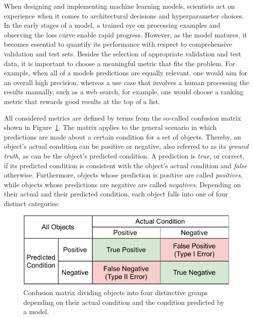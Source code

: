 When designing and implementing machine learning models, scientists act on experience when it comes to architectural decisions and hyperparameter choices. In the early stages of a model, a trained eye on processing examples and observing the loss curve enable rapid progress. However, as the model matures, it becomes essential to quantify its performance with respect to comprehensive validation and test sets. Besides the selection of appropriate validation and test data, it is important to choose a meaningful metric that fits the problem. For example, when all of a models predictions are equally relevant, one would aim for an overall high precision, whereas a use case that involves a human processing the results manually, such as a web search, for example, one would choose a ranking metric that rewards good results at the top of a list.

All considered metrics are defined by terms from the so-called confusion matrix shown in Figure~\ref{fig:2_basics/2_metrics/1_confusion_matrix}. The matrix applies to the general scenario in which predictions are made about a certain condition for a set of objects. Thereby, an object's actual condition can be positive or negative, also referred to as its \emph{ground truth}, as can be the object's predicted condition. A prediction is \emph{true}, or correct, if its predicted condition is consistent with the object's actual condition and \emph{false} otherwise. Furthermore, objects whose prediction is positive are called \emph{positives}, while objects whose predictions are negative are called \emph{negatives}. Depending on their actual and their predicted condition, each object falls into one of four distinct categories:

\begin{figure}[t]
    \centering
    \includegraphics{2_basics/2_metrics/confusion_matrix}
    \caption{Confusion matrix dividing objects into four distinctive groups depending on their actual condition and the condition predicted by a model.}
    \label{fig:2_basics/2_metrics/1_confusion_matrix}
\end{figure}

